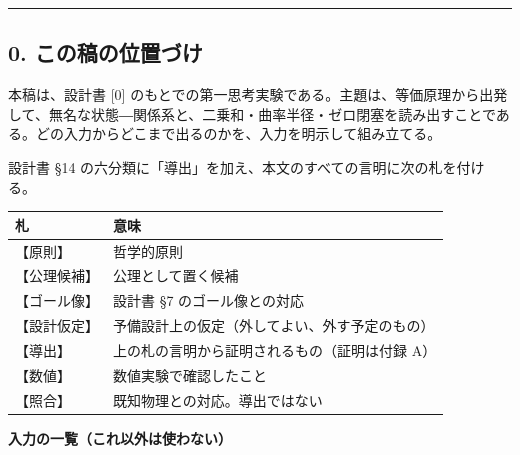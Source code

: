 \documentclass[
  a4paper,
]{ltjsarticle}
\newcounter{none} %
\begin{document}
\begin{center}\rule{0.5\linewidth}{0.5pt}\end{center}

\subsection{0.
この稿の位置づけ}\label{ux3053ux306eux7a3fux306eux4f4dux7f6eux3065ux3051}

本稿は、設計書 {[}0{]}
のもとでの第一思考実験である。主題は、等価原理から出発して、無名な状態―関係系と、二乗和・曲率半径・ゼロ閉塞を読み出すことである。どの入力からどこまで出るのかを、入力を明示して組み立てる。

設計書 §14
の六分類に「導出」を加え、本文のすべての言明に次の札を付ける。

{\def\LTcaptype{none} %
\begin{longtable}[]{@{}ll@{}}
\toprule\noalign{}
札 & 意味 \\
\midrule\noalign{}
\endhead
\bottomrule\noalign{}
\endlastfoot
【原則】 & 哲学的原則 \\
【公理候補】 & 公理として置く候補 \\
【ゴール像】 & 設計書 §7 のゴール像との対応 \\
【設計仮定】 & 予備設計上の仮定（外してよい、外す予定のもの） \\
【導出】 & 上の札の言明から証明されるもの（証明は付録 A） \\
【数値】 & 数値実験で確認したこと \\
【照合】 & 既知物理との対応。導出ではない \\
\end{longtable}
}

\textbf{入力の一覧（これ以外は使わない）}
\end{document}
